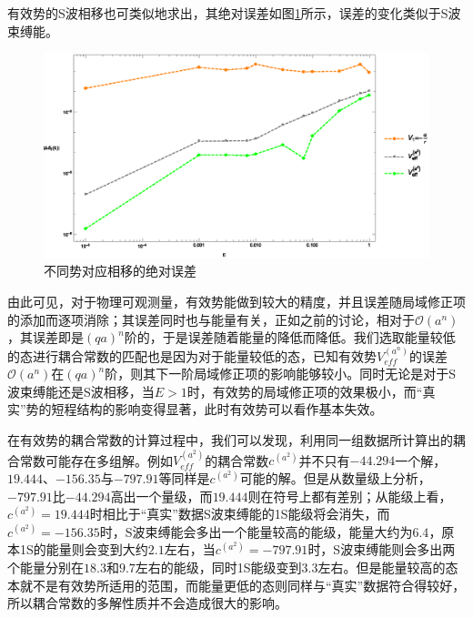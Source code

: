 \documentclass[cs4size,titlepage,twoside]{ctexart}
\begin{document}
有效势的S波相移也可类似地求出，其绝对误差如图\ref{Swavephaseerror}所示，误差的变化类似于S波束缚能。
\begin{figure}[!htbp]
	\centering
	\includegraphics[width=6in]{Test_PS_CurveFitting_Figure3.eps}
	\caption{不同势对应相移的绝对误差}\label{Swavephaseerror}
\end{figure}

由此可见，对于物理可观测量，有效势能做到较大的精度，并且误差随局域修正项的添加而逐项消除；其误差同时也与能量有关，正如之前的讨论，相对于$\mathcal{O}(a^n)$，其误差即是$(qa)^n$阶的，于是误差随着能量的降低而降低。我们选取能量较低的态进行耦合常数的匹配也是因为对于能量较低的态，已知有效势$V_{eff}^{(a^n)}$的误差$\mathcal{O}(a^n)$在$(qa)^n$阶，则其下一阶局域修正项的影响能够较小。同时无论是对于S波束缚能还是S波相移，当$E>1$时，有效势的局域修正项的效果极小，而“真实”势的短程结构的影响变得显著，此时有效势可以看作基本失效。

在有效势的耦合常数的计算过程中，我们可以发现，利用同一组数据所计算出的耦合常数可能存在多组解。例如$V_{eff}^{(a^2)}$的耦合常数$ c^{(a^2)}$并不只有$-44.294$一个解，$19.444$、$-156.35$与$-797.91$等同样是$c^{(a^2)}$可能的解。但是从数量级上分析，$-797.91$比$-44.294$高出一个量级，而$19.444$则在符号上都有差别；从能级上看，$c^{(a^2)}=19.444$时相比于“真实”数据S波束缚能的1S能级将会消失，而$c^{(a^2)}=-156.35$时，S波束缚能会多出一个能量较高的能级，能量大约为$6.4$，原本1S的能量则会变到大约$2.1$左右，当$c^{(a^2)}=-797.91$时，S波束缚能则会多出两个能量分别在$18.3$和$9.7$左右的能级，同时1S能级变到$3.3$左右。但是能量较高的态本就不是有效势所适用的范围，而能量更低的态则同样与“真实”数据符合得较好，所以耦合常数的多解性质并不会造成很大的影响。
\end{document}
